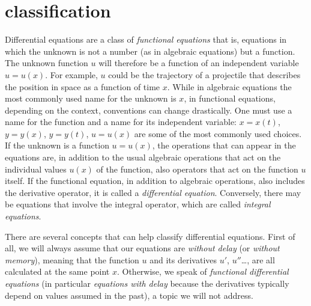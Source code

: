\section{classification}

Differential equations are a class of \emph{functional equations}
that is, equations in which the unknown is not a number (as in algebraic
equations) but a function. The unknown function $u$ will therefore be a function
of an independent variable $u=u(x)$.
For example, $u$ could be the trajectory of a projectile that describes the
position in space as a function of time $x$. While in algebraic equations the
most commonly used name for the unknown is $x$, in functional equations,
depending on the context, conventions can change drastically. One must use a
name for the function and a name for its independent variable: $x=x(t)$,
$y=y(x)$, $y=y(t)$, $u=u(x)$ are some of the most commonly used choices.
If the unknown is a function $u=u(x)$, the operations that can appear in the
equations are, in addition to the usual algebraic operations that act on the
individual values $u(x)$ of the function, also operators that act on the
function $u$ itself.
If the functional equation, in addition to algebraic operations, also includes
the derivative operator, it is called a %
%
\emph{differential equation}.
Conversely, there may be equations that involve the integral operator, which are
called \emph{integral equations}.

There are several concepts that can help classify differential equations.
First of all, we will always assume that our equations are \emph{without delay}%
(or \emph{without memory}),
meaning that the function $u$ and its derivatives $u'$, $u''$\dots,
are all calculated at the same point $x$.
Otherwise, we speak of
\emph{functional differential equations} (in particular \emph{equations with delay}
because the derivatives typically depend on values assumed in the past),
a topic we will not address.

